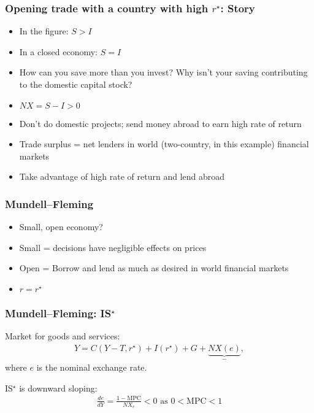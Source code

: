 \documentclass[presentation,dvipsnames]{beamer}
\begin{document}
\begin{frame}
\frametitle{Opening trade with a country with high $r^{\star}$: Story}
\begin{itemize}[label={--}]
\item In the figure: $S > I$
\item In a closed economy: $S = I$
\item How can you save more than you invest? Why isn't your saving contributing to the domestic capital stock?
\item $NX = S - I > 0$
\item Don't do domestic projects; send money abroad to earn high rate of return
\item Trade surplus = net lenders in world (two-country, in this example) financial markets
\item \textcolor{RubineRed}{Take advantage of high rate of return and lend abroad}
\end{itemize}
\end{frame}

\begin{frame}
\frametitle{Mundell--Fleming}
\begin{itemize}[label={--}]
\item Small, open economy?
\item Small = decisions have negligible effects on prices
\item Open = Borrow and lend as much as desired in world financial markets
\item $r = r^{\star}$
\end{itemize}
\end{frame}

\begin{frame}
\frametitle{Mundell--Fleming: IS$^{\star}$}
Market for goods and services:
\begin{align*}
Y = C(Y-T, r^{\star})  + I(r^{\star}) + G + \underbrace{NX(e)}_{-} ,
\end{align*}
where $e$ is the nominal exchange rate.

\vspace{1em}

IS$^{\star}$ is downward sloping:
\begin{align*}
\frac{de}{dY} = \frac{1-\text{MPC}}{NX_{e}} < 0 \text{ as } 0 < \text{MPC} < 1
\end{align*}
\end{frame}

\end{document}
